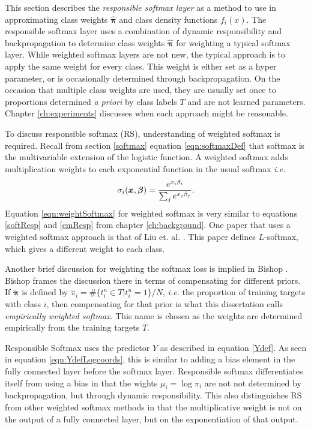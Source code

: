 \label{sect:LayerDesc}
This section describes the \textit{responsible softmax layer} as a method to use \DR in approximating class weights \( \hat{\bm \pi} \) and class density functions \( f_i(x) \). The responsible softmax layer uses a combination of dynamic responsibility and backpropagation to determine class weights \( \hat{\bm \pi} \) for weighting a typical softmax layer.  While weighted softmax layers are not new, the typical approach is to apply the same weight for every class.  This weight is either set as a hyper parameter, or is occasionally determined through backpropagation.  On the occasion that multiple class weights are used, they are usually set once to proportions determined \textit{a priori} by class labels \( T \) and are not learned parameters.  Chapter \ref{ch:experiments} discusses when each approach might be reasonable.

To discuss responsible softmax (RS), understanding of weighted softmax is required.  Recall from section \ref{softmax} equation \ref{eqn:softmaxDef} that softmax is the multivariable extension of the logistic function. A weighted softmax adds multiplication weights to each exponential function in the usual softmax \textit{i.e.}
\begin{equation}\label{eqn:weightSoftmax}
\sigma_i(\bm x,\bm{\beta}) = \dfrac{e^{x_i\beta_i}}{\sum_j e^{x_j\beta_j}}.
\end{equation}
Equation \ref{eqn:weightSoftmax} for weighted softmax is very similar to equations \ref{softResp} and \ref{emResp} from chapter \ref{ch:background}. One paper that uses a weighted softmax approach is that of Liu et. al. \cite{liu2016large}. This paper defines \( L \)-softmax, which gives a different weight to each class. 

Another brief discussion for weighting the softmax loss is implied in Bishop \cite[sect. 6.5]{Bishop1995}.  Bishop frames the discussion there in terms of compensating for different priors.  If \( \tilde{\!\bm\pi} \) is defined by \( \tilde{\!\pi}_i = \#\{t_i^{n}\in T|t_i^{n}=1\}/N \), \textit{i.e.} the proportion of training targets with class \( i \), then compensating for that prior is what this dissertation calls \textit{empirically weighted softmax}.  This name is chosen as the weights are determined empirically from the training targets \( T \).

Responsible Softmax uses the predictor \( Y \) as described in equation \ref{Ydef}.  As seen in equation \ref{eqn:YdefLogcoords}, this is similar to adding a bias element in the fully connected layer before the softmax layer. Responsible softmax differentiates itself from using a bias in that the wights \( \mu_i = \log\pi_i \) are not not determined by backpropagation, but through dynamic responsibility.  This also distinguishes RS from other weighted softmax methods in that the multiplicative weight is not on the output of a fully connected layer, but on the exponentiation of that output.

